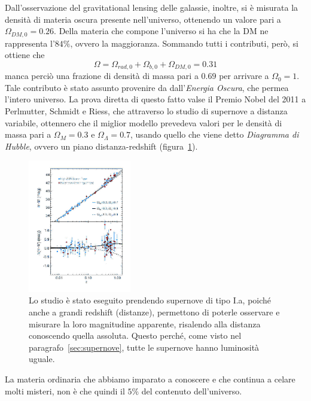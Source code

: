 Dall'osservazione del gravitational lensing delle galassie, inoltre, si è misurata la densità di materia oscura presente nell'universo, ottenendo un valore pari a $\Omega_{DM,0} = 0.26$. Della materia che compone l'universo si ha che la DM ne rappresenta l'$84\%$, ovvero la maggioranza. Sommando tutti i contributi, però, si ottiene che
\[
    \Omega = \Omega_{rad,0} + \Omega_{b,0} + \Omega_{DM,0} = 0.31
\]
manca perciò una frazione di densità di massa pari a $0.69$ per arrivare a $\Omega_0 = 1$. Tale contributo è stato assunto provenire da dall'\textit{Energia Oscura}, che permea l'intero universo. La prova diretta di questo fatto valse il Premio Nobel del 2011 a Perlmutter, Schmidt e Riess, che attraverso lo studio di supernove a distanza variabile, ottennero che il miglior modello prevedeva valori per le densità di massa pari a $\Omega_M = 0.3$ e $\Omega_\Lambda = 0.7$, usando quello che viene detto \textit{Diagramma di Hubble}, ovvero un piano distanza-redshift (figura~\ref{fig:diagramma-hubble}).
\begin{figure}
    \centering
    \includegraphics[width=0.4\textwidth]{immagini/hubble_diagram.jpg}
    \caption{Lo studio è stato eseguito prendendo supernove di tipo I.a, poiché anche a grandi redshift (distanze), permettono di poterle osservare e misurare la loro magnitudine apparente, risalendo alla distanza conoscendo quella assoluta. Questo perché, come visto nel paragrafo~\ref{sec:supernove}, tutte le supernove hanno luminosità uguale.}\label{fig:diagramma-hubble}
\end{figure}

La materia ordinaria che abbiamo imparato a conoscere e che continua a celare molti misteri, non è che quindi il $5\%$ del contenuto dell'universo. 